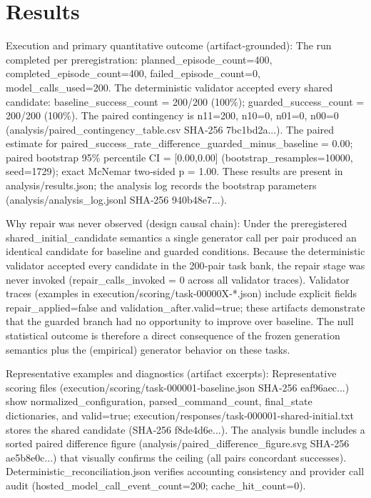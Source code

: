 \documentclass[conference]{IEEEtran}
\begin{document}
\section{Results}
Execution and primary quantitative outcome (artifact‑grounded): The run completed per preregistration: planned\_episode\_count=400, completed\_episode\_count=400, failed\_episode\_count=0, model\_calls\_used=200. The deterministic validator accepted every shared candidate: baseline\_success\_count = 200/200 (100\%); guarded\_success\_count = 200/200 (100\%). The paired contingency is n11=200, n10=0, n01=0, n00=0 (analysis/paired\_contingency\_table.csv SHA‑256 7bc1bd2a...). The paired estimate for paired\_success\_rate\_difference\_guarded\_minus\_baseline = 0.00; paired bootstrap 95\% percentile CI = [0.00,0.00] (bootstrap\_resamples=10000, seed=1729); exact McNemar two‑sided p = 1.00. These results are present in analysis/results.json; the analysis log records the bootstrap parameters (analysis/analysis\_log.jsonl SHA‑256 940b48e7...).

Why repair was never observed (design causal chain): Under the preregistered shared\_initial\_candidate semantics a single generator call per pair produced an identical candidate for baseline and guarded conditions. Because the deterministic validator accepted every candidate in the 200‑pair task bank, the repair stage was never invoked (repair\_calls\_invoked = 0 across all validator traces). Validator traces (examples in execution/scoring/task‑00000X‑*.json) include explicit fields repair\_applied=false and validation\_after.valid=true; these artifacts demonstrate that the guarded branch had no opportunity to improve over baseline. The null statistical outcome is therefore a direct consequence of the frozen generation semantics plus the (empirical) generator behavior on these tasks.

Representative examples and diagnostics (artifact excerpts): Representative scoring files (execution/scoring/task-000001‑baseline.json SHA‑256 eaf96aec...) show normalized\_configuration, parsed\_command\_count, final\_state dictionaries, and valid=true; execution/responses/task-000001-shared-initial.txt stores the shared candidate (SHA‑256 f8de4d6e...). The analysis bundle includes a sorted paired difference figure (analysis/paired\_difference\_figure.svg SHA‑256 ae5b8e0c...) that visually confirms the ceiling (all pairs concordant successes). Deterministic\_reconciliation.json verifies accounting consistency and provider call audit (hosted\_model\_call\_event\_count=200; cache\_hit\_count=0).
\end{document}
